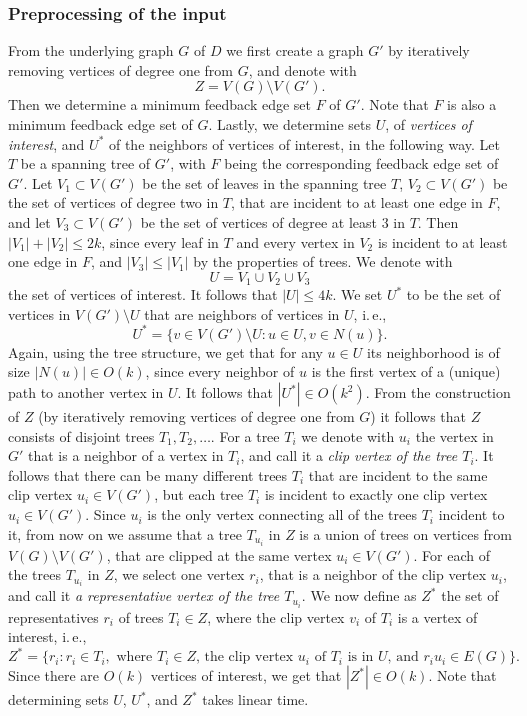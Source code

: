 \documentclass[a4paper,UKenglish,cleveref, autoref, thm-restate]{lipics-v2021}
\newcommand{\ie}{i.\,e.,\ }
\begin{document}
\subsubsection{Preprocessing of the input}
From the underlying graph $G$ of $D$ we first create a graph $G'$ by
iteratively removing vertices of degree one from $G$,
and denote with 
\[
Z = V(G) \setminus V(G').
\]
Then we determine a minimum feedback edge set $F$ of $G'$.
Note that $F$ is also a minimum feedback edge set of $G$.
Lastly, we determine sets $U$, of \emph{vertices of interest}, and $U^*$ of the neighbors of vertices of interest, in the following way.
Let $T$ be a spanning tree of $G'$, with $F$ being the corresponding feedback edge set of $G'$.
Let $V_1 \subset V(G')$ be the set of leaves in the spanning tree $T$, $V_2 \subset V(G')$ be the set of vertices of degree two in $T$, that are incident to at least one edge in $F$, 
and let $V_3 \subset V(G')$ be the set of vertices of degree at least $3$ in $T$. 
Then $|V_1| + |V_2| \leq 2k$, since every leaf in $T$ and every vertex in $V_2$ is incident to at least one edge in $F$,
and $|V_3| \leq |V_1|$ by the properties of trees.
We denote with 
\[U = V_1 \cup V_2 \cup V_3\]
the set of vertices of interest. It follows that $|U| \leq 4k$.
We set $U^*$ to be the set of vertices in $V(G') \setminus U$ that are neighbors of vertices in $U$, \ie 
\[U^* = \{v \in V(G') \setminus U  :  u \in U, v \in N(u)\}.\]
Again, using the tree structure, we get that for any $u \in U$ its neighborhood is of size $|N(u)| \in O(k)$, since every neighbor of $u$ is the first vertex of a (unique) path to another vertex in $U$.
It follows that $|U^*| \in O(k^2)$.
From the construction of $Z$ (by iteratively removing vertices of degree one from $G$)
it follows that $Z$ consists of disjoint trees $T_1, T_2, \dots$.
For a tree $T_i$ we denote with $u_i$ the vertex in $G'$ that is a neighbor of a vertex in $T_i$, 
and call it a \emph{clip vertex of the tree $T_i$}.
It follows that there can be many different trees $T_i$ that are incident to the same clip vertex $u_i \in V(G')$,
but each tree $T_i$ is incident to exactly one clip vertex $u_i \in V(G')$.
Since $u_i$ is the only vertex connecting all of the trees $T_i$ incident to it,
from now on we assume that a tree $T_{u_i}$ in $Z$ is a union of trees on vertices from $V(G) \setminus V(G')$,
that are clipped at the same vertex $u_i \in V(G')$.
For each of the trees $T_{u_i}$ in $Z$, we select one vertex $r_i$, that is a neighbor of the clip vertex $u_i$,
and call it \emph{a representative vertex of the tree $T_{u_i}$}.
We now define as $Z^*$ the set of representatives $r_i$ of trees $T_i \in Z$,
where the clip vertex $v_i$ of $T_i$ is a vertex of interest, \ie
\[
Z^* = \{ r_i  :  r_i \in T_i, \text{ where $T_i \in Z$, the clip vertex $u_i$ of $T_i$ is in $U$, and $r_i u_i \in E(G)$}\}.
\]
Since there are $O(k)$ vertices of interest, we get that $|Z^*| \in O(k)$.
Note that determining sets $U$, $U^*$, and $Z^*$ takes linear time.
\end{document}

